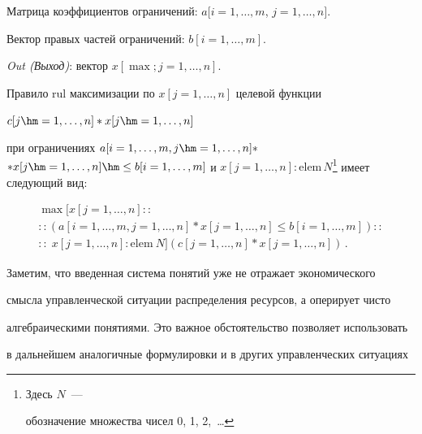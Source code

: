 \noindent


Матрица коэффициентов ограничений: $a[i=1,\ldots , m$, $j=1,\ldots , n]$.





\noindent


Вектор правых частей ограничений: $b[i=1, \ldots , m]$.





  \textit{Out (Выход)}: вектор $x[\max; j=1, \ldots , n]$.





  Правило rul максимизации по $x[j=1, \ldots , n]$ целевой функции


  $c[j\hm=1, \ldots , n]*x[j\hm=1,\ldots , n]$


  при ограничениях $a[i=1,\ldots , m, j\hm=1,\ldots ,n]*$\linebreak $*x[j\hm=1,\ldots ,n] \hm\leq


b[i=1,\ldots , m]$ и $x[j=1,\ldots ,n]: \mathrm{elem}\,N$\footnote{Здесь $N$~---


обозначение множества чисел 0, 1, 2,\ \ldots} имеет следующий вид:





\noindent


  \begin{multline*}


  \max [x[j=1,\ldots , n]::\\


  ::    (a[i=1,\ldots ,m, j=1,\ldots ,n]*


  x[j=1,\ldots ,n] \leq b[i=1,\ldots ,m])::\\


::\;x[j=1,\ldots ,n]: \mathrm{elem}~N] (c[j=1,\ldots ,n] * x[j=1,\ldots ,n])\,.


  \end{multline*}





  Заметим, что введенная система понятий уже не отражает экономического


смысла управленческой ситуации распределения ресурсов, а оперирует чисто


алгебраическими понятиями. Это важное обстоятельство позволяет использовать


в дальнейшем аналогичные формулировки и в других управленческих ситуациях


